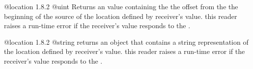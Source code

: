{@location}
{1.8.2}
{@uint}
{Returns an  value containing the the offset from the the beginning of the source of the location defined by receiver's value.}
{this reader raises a run-time error if the receiver's value responds  to the .}


{@location}
{1.8.2}
{@string}
{returns an  object that contains a string representation of the location defined by receiver's value.}
{this reader raises a run-time error if the receiver's value responds  to the .}

